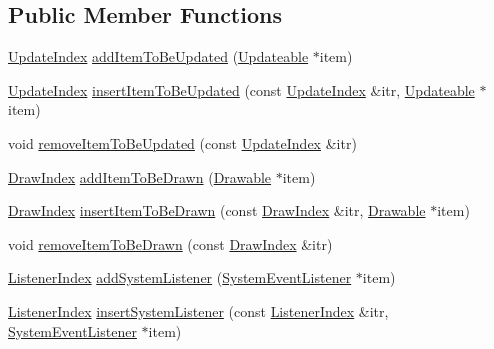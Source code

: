 \subsection*{Public Member Functions}
\begin{DoxyCompactItemize}
\item 
\hyperlink{classZeta_1_1GeneralLoop_ae1284d366ca644323f019a9e3fcb1b0e}{Update\+Index} \hyperlink{classZeta_1_1GeneralLoop_a35b72f6ff8e3db3f0fa5c6d5f214551c}{add\+Item\+To\+Be\+Updated} (\hyperlink{classZeta_1_1Updateable}{Updateable} $\ast$item)
\item 
\hyperlink{classZeta_1_1GeneralLoop_ae1284d366ca644323f019a9e3fcb1b0e}{Update\+Index} \hyperlink{classZeta_1_1GeneralLoop_a744036b6c533ce6b9d97d73f2c2a9bd2}{insert\+Item\+To\+Be\+Updated} (const \hyperlink{classZeta_1_1GeneralLoop_ae1284d366ca644323f019a9e3fcb1b0e}{Update\+Index} \&itr, \hyperlink{classZeta_1_1Updateable}{Updateable} $\ast$item)
\item 
void \hyperlink{classZeta_1_1GeneralLoop_a35bd3ccd1ade50dc0b038f7590c43660}{remove\+Item\+To\+Be\+Updated} (const \hyperlink{classZeta_1_1GeneralLoop_ae1284d366ca644323f019a9e3fcb1b0e}{Update\+Index} \&itr)
\item 
\hyperlink{classZeta_1_1GeneralLoop_a2da478213f010a795485306725782cf4}{Draw\+Index} \hyperlink{classZeta_1_1GeneralLoop_a4da63a2f94d6b70bd7592a95adbd2b28}{add\+Item\+To\+Be\+Drawn} (\hyperlink{classZeta_1_1Drawable}{Drawable} $\ast$item)
\item 
\hyperlink{classZeta_1_1GeneralLoop_a2da478213f010a795485306725782cf4}{Draw\+Index} \hyperlink{classZeta_1_1GeneralLoop_a7a797e55987c1eada965ba3633056e2d}{insert\+Item\+To\+Be\+Drawn} (const \hyperlink{classZeta_1_1GeneralLoop_a2da478213f010a795485306725782cf4}{Draw\+Index} \&itr, \hyperlink{classZeta_1_1Drawable}{Drawable} $\ast$item)
\item 
void \hyperlink{classZeta_1_1GeneralLoop_aeb55df0ba9b5ac76db741d68a0b6601d}{remove\+Item\+To\+Be\+Drawn} (const \hyperlink{classZeta_1_1GeneralLoop_a2da478213f010a795485306725782cf4}{Draw\+Index} \&itr)
\item 
\hyperlink{classZeta_1_1GeneralLoop_a1e3fa8c44577a032a92aca0828310d30}{Listener\+Index} \hyperlink{classZeta_1_1GeneralLoop_a6855283a3c95e37a77c4454a7b152856}{add\+System\+Listener} (\hyperlink{classZeta_1_1SystemEventListener}{System\+Event\+Listener} $\ast$item)
\item 
\hyperlink{classZeta_1_1GeneralLoop_a1e3fa8c44577a032a92aca0828310d30}{Listener\+Index} \hyperlink{classZeta_1_1GeneralLoop_a58807d603313d970072bef8bac9f6154}{insert\+System\+Listener} (const \hyperlink{classZeta_1_1GeneralLoop_a1e3fa8c44577a032a92aca0828310d30}{Listener\+Index} \&itr, \hyperlink{classZeta_1_1SystemEventListener}{System\+Event\+Listener} $\ast$item)

\end{DoxyCompactItemize}
